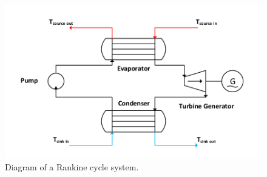 \begin{figure}[h]
	\centering

	\includegraphics[width=\textwidth]{figures/RankineCycleDiagram.pdf}

	\caption{Diagram of a Rankine cycle system.}
	\label{fig:rankine_cycle_diagram}
	
\end{figure}